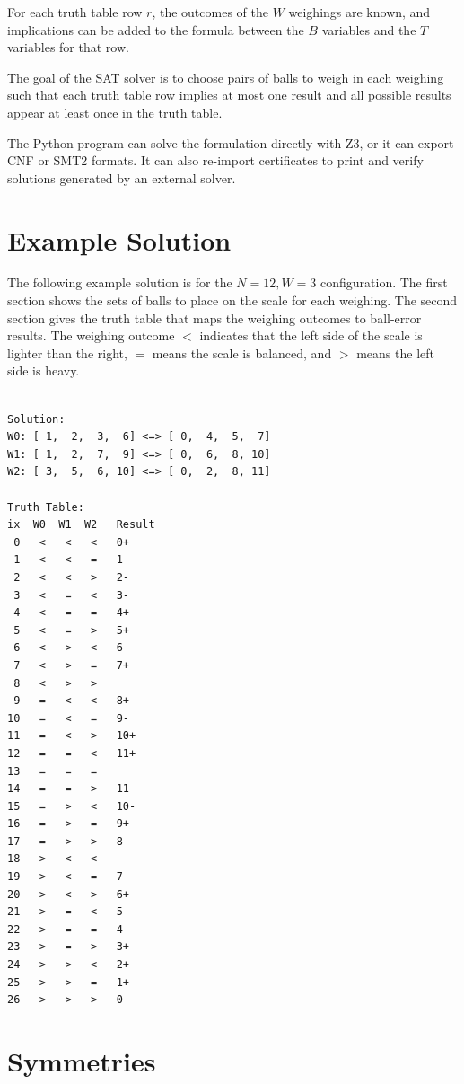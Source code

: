 \documentclass[conference]{IEEEtran}
\begin{document}
For each truth table row $r$, the outcomes of the $W$ weighings are known, and implications can be added to the formula
between the $B$ variables and the $T$ variables for that row.

The goal of the SAT solver is to choose pairs of balls to weigh in each weighing such that each truth table row implies
at most one result and all possible results appear at least once in the truth table.

The Python program can solve the formulation directly with Z3, or it can export CNF or SMT2 formats.
It can also re-import certificates to print and verify solutions generated by an external solver.

\section{Example Solution}

The following example solution is for the $N=12, W=3$ configuration.
The first section shows the sets of balls to place on the scale for each weighing.
The second section gives the truth table that maps the weighing outcomes to ball-error results.
The weighing outcome $<$ indicates that the left side of the scale is lighter than the right,
$=$ means the scale is balanced, and $>$ means the left side is heavy.

\begin{small}
\begin{BVerbatim}

Solution:
W0: [ 1,  2,  3,  6] <=> [ 0,  4,  5,  7]
W1: [ 1,  2,  7,  9] <=> [ 0,  6,  8, 10]
W2: [ 3,  5,  6, 10] <=> [ 0,  2,  8, 11]

Truth Table:
ix  W0  W1  W2   Result
 0   <   <   <   0+
 1   <   <   =   1-
 2   <   <   >   2-
 3   <   =   <   3-
 4   <   =   =   4+
 5   <   =   >   5+
 6   <   >   <   6-
 7   <   >   =   7+
 8   <   >   >
 9   =   <   <   8+
10   =   <   =   9-
11   =   <   >   10+
12   =   =   <   11+
13   =   =   =
14   =   =   >   11-
15   =   >   <   10-
16   =   >   =   9+
17   =   >   >   8-
18   >   <   <
19   >   <   =   7-
20   >   <   >   6+
21   >   =   <   5-
22   >   =   =   4-
23   >   =   >   3+
24   >   >   <   2+
25   >   >   =   1+
26   >   >   >   0-
\end{BVerbatim}
\end{small}

\section{Symmetries}
\end{document}
